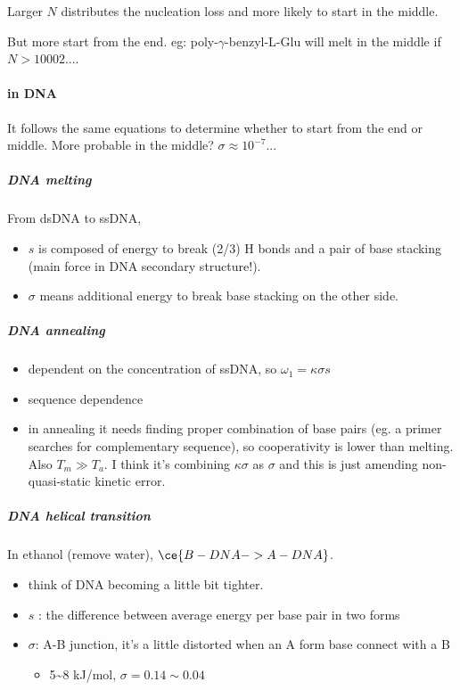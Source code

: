 \documentclass[]{article}
\let\oldparagraph\paragraph
\renewcommand{\paragraph}[1]{\oldparagraph{#1}\mbox{}}
\let\oldsubparagraph\subparagraph
\renewcommand{\subparagraph}[1]{\oldsubparagraph{#1}\mbox{}}
\begin{document}
Larger \(N\) distributes the nucleation loss and more likely to start in
the middle.

But more start from the end. eg: poly-\(\gamma\)-benzyl-L-Glu will melt
in the middle if \(N>10002\)....

\hypertarget{in-dna}{%
\paragraph{in DNA}\label{in-dna}}

It follows the same equations to determine whether to start from the end
or middle. More probable in the middle? \(\sigma\approx10^{-7}\)...

\hypertarget{dna-melting}{%
\subparagraph{DNA melting}\label{dna-melting}}

From dsDNA to ssDNA,

\begin{itemize}
\item
  \(s\) is composed of energy to break (2/3) H bonds and a pair of base
  stacking (main force in DNA secondary structure!). 
\item
  \(\sigma\) means additional energy to break base stacking on the other
  side.
\end{itemize}

\hypertarget{dna-annealing}{%
\subparagraph{DNA annealing}\label{dna-annealing}}

\begin{itemize}
\item
  dependent on the concentration of ssDNA, so
  \(\omega_1=\kappa\sigma s\)
\item
  sequence dependence
\item
  in annealing it needs finding proper combination of base pairs (eg. a
  primer searches for complementary sequence), so cooperativity is lower
  than melting. Also \(T_m\gg T_a\). I think it's combining
  \(\kappa\sigma\) as \(\sigma\) and this is just amending
  non-quasi-static kinetic error. 
\end{itemize}

\hypertarget{dna-helical-transition}{%
\subparagraph{DNA helical transition}\label{dna-helical-transition}}

In ethanol (remove water), \(\ce{B-DNA->A-DNA}\).

\begin{itemize}
\item
  think of DNA becoming a little bit tighter.
\item
  \(s\) : the difference between average energy per base pair in two
  forms
\item
  \(\sigma\): A-B junction, it's a little distorted when an A form base
  connect with a B

  \begin{itemize}
  \item
    5\textasciitilde{}8 kJ/mol, \(\sigma=0.14\sim0.04\)
  \end{itemize}
\end{itemize}
\end{document}
